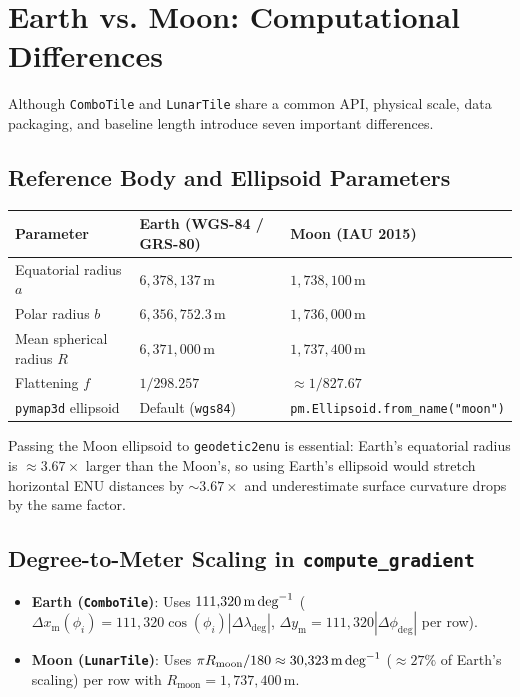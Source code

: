 \documentclass[11pt,letterpaper]{article}
\begin{document}
\appendix
\section{Earth vs. Moon: Computational Differences}
Although \texttt{ComboTile} and \texttt{LunarTile} share a common API, physical scale, data packaging, and baseline length introduce seven important differences.

\subsection{Reference Body and Ellipsoid Parameters}
\begin{center}
\begin{tabular}{@{}lll@{}}
\toprule
\textbf{Parameter} & \textbf{Earth (WGS-84 / GRS-80)} & \textbf{Moon (IAU 2015)} \\
\midrule
Equatorial radius $a$ & $6{,}378{,}137\,\text{m}$ & $1{,}738{,}100\,\text{m}$ \\
Polar radius $b$ & $6{,}356{,}752.3\,\text{m}$ & $1{,}736{,}000\,\text{m}$ \\
Mean spherical radius $R$ & $6{,}371{,}000\,\text{m}$ & $1{,}737{,}400\,\text{m}$ \\
Flattening $f$ & $1/298.257$ & $\approx 1/827.67$ \\
\texttt{pymap3d} ellipsoid & Default (\texttt{wgs84}) & \texttt{pm.Ellipsoid.from\_name("moon")} \\
\bottomrule
\end{tabular}
\end{center}
Passing the Moon ellipsoid to \texttt{geodetic2enu} is essential: Earth's equatorial radius is $\approx 3.67\times$ larger than the Moon's, so using Earth's ellipsoid would stretch horizontal ENU distances by $\sim 3.67\times$ and underestimate surface curvature drops by the same factor.

\subsection{Degree-to-Meter Scaling in \texttt{compute\_gradient}}
\begin{itemize}
  \item \textbf{Earth (\texttt{ComboTile})}: Uses $111{,}320\,\text{m\,deg}^{-1}$ ($\Delta x_{\mathrm{m}}(\phi_i) = 111{,}320 \cos(\phi_i)|\Delta\lambda_{\mathrm{deg}}|$, $\Delta y_{\mathrm{m}} = 111{,}320|\Delta\phi_{\mathrm{deg}}|$ per row).
  \item \textbf{Moon (\texttt{LunarTile})}: Uses $\pi R_{\text{moon}}/180 \approx 30{,}323\,\text{m\,deg}^{-1}$ ($\approx 27\%$ of Earth's scaling) per row with $R_{\text{moon}} = 1{,}737{,}400\,\text{m}$.
\end{itemize}
\end{document}
